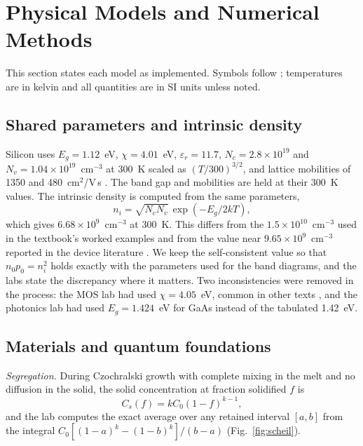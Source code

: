 \documentclass[conference]{IEEEtran}
\begin{document}
\section{Physical Models and Numerical Methods}\label{sec:models}
This section states each model as implemented. Symbols follow \cite{neamen2012}; temperatures are in kelvin and all quantities are in SI units unless noted.

\subsection{Shared parameters and intrinsic density}\label{sec:params}
Silicon uses $E_g=1.12$~eV, $\chi=4.01$~eV, $\varepsilon_r=11.7$, $N_c=2.8\times10^{19}$ and $N_v=1.04\times10^{19}$~cm$^{-3}$ at 300~K scaled as $(T/300)^{3/2}$, and lattice mobilities of 1350 and 480~cm$^2$/V\,s \cite{neamen2012}. The band gap and mobilities are held at their 300~K values. The intrinsic density is computed from the same parameters,
\begin{equation}
n_i=\sqrt{N_cN_v}\,\exp\!\left(-E_g/2kT\right),
\end{equation}
which gives $6.68\times10^9$~cm$^{-3}$ at 300~K. This differs from the $1.5\times10^{10}$~cm$^{-3}$ used in the textbook's worked examples and from the value near $9.65\times10^9$~cm$^{-3}$ reported in the device literature \cite{sproul1991,altermatt2003}. We keep the self-consistent value so that $n_0p_0=n_i^2$ holds exactly with the parameters used for the band diagrams, and the labs state the discrepancy where it matters. Two inconsistencies were removed in the process: the MOS lab had used $\chi=4.05$~eV, common in other texts \cite{sze2007}, and the photonics lab had used $E_g=1.424$~eV for GaAs instead of the tabulated 1.42~eV.

\subsection{Materials and quantum foundations}
\emph{Segregation.} During Czochralski growth with complete mixing in the melt and no diffusion in the solid, the solid concentration at fraction solidified $f$ is \cite{scheil1942}
\begin{equation}
C_s(f)=kC_0(1-f)^{k-1},
\end{equation}
and the lab computes the exact average over any retained interval $[a,b]$ from the integral $C_0[(1-a)^k-(1-b)^k]/(b-a)$ (Fig.~\ref{fig:scheil}).
\end{document}
